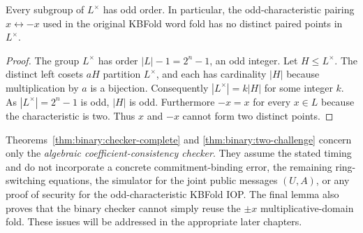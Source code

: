 \begin{lemma}\label{lem:binary:no-even-subgroup}
Every subgroup of $L^\times$ has odd order.
In particular, the odd-characteristic
pairing $x\leftrightarrow-x$ used in the
original KBFold word fold has no distinct
paired points in $L^\times$.
\end{lemma}
\begin{proof}
The group $L^\times$ has order
$|L|-1=2^n-1$, an odd integer.
Let $H\leq L^\times$. The distinct left cosets $aH$
partition $L^\times$, and each has cardinality $|H|$
because multiplication by $a$ is a bijection.
Consequently $|L^\times|=k|H|$ for some integer $k$.
As $|L^\times|=2^n-1$ is odd, $|H|$ is odd.
Furthermore $-x=x$ for every $x\in L$
because the characteristic is two.
Thus $x$ and $-x$ cannot form two distinct
points.
\end{proof}

\begin{remark}
Theorems~\ref{thm:binary:checker-complete} and
\ref{thm:binary:two-challenge} concern only
the \emph{algebraic coefficient-consistency
checker}. They assume the stated timing
and do not incorporate a concrete
commitment-binding error, the remaining
ring-switching equations, the simulator
for the joint public messages $(U,A)$,
or any proof of security for the
odd-characteristic KBFold IOP.
The final lemma also proves that the
binary checker cannot simply reuse the
$\pm x$ multiplicative-domain fold.
These issues will be addressed in the
appropriate later chapters.
\end{remark}
